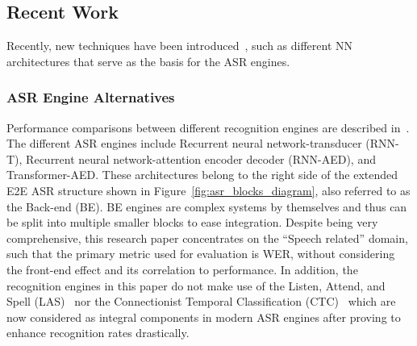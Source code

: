 


\subsection{Recent Work}
Recently, new techniques have been introduced~\cite{900384911,20202222222,9003849,7471664,8466865},
such as
different NN architectures that serve as the basis for
the ASR engines.  

\subsubsection{ASR Engine Alternatives}
Performance comparisons between different recognition
engines are described in~\cite{900384911}. 
The different ASR engines include 
Recurrent neural network-transducer (RNN-T), 
Recurrent neural network-attention encoder decoder (RNN-AED),
and Transformer-AED.
These architectures belong to the right side
of the extended E2E ASR structure shown in 
Figure~\ref{fig:asr_blocks_diagram}, 
also referred to as the
Back-end (BE).
BE engines are complex systems by themselves
and thus can be split into multiple smaller
blocks to ease integration.
Despite being very comprehensive, this research paper 
concentrates on
the ``Speech related'' domain,
such that the primary metric used for evaluation is WER,
without considering the front-end
effect and its correlation to performance.
In addition, the recognition engines in this paper
do not make use of the 
Listen, Attend, and Spell (LAS)~\cite{7472621}
nor the Connectionist Temporal 
Classification (CTC)~\cite{hannun2017sequence}
which are now considered as integral components in modern 
ASR engines after proving to enhance recognition rates drastically. 

